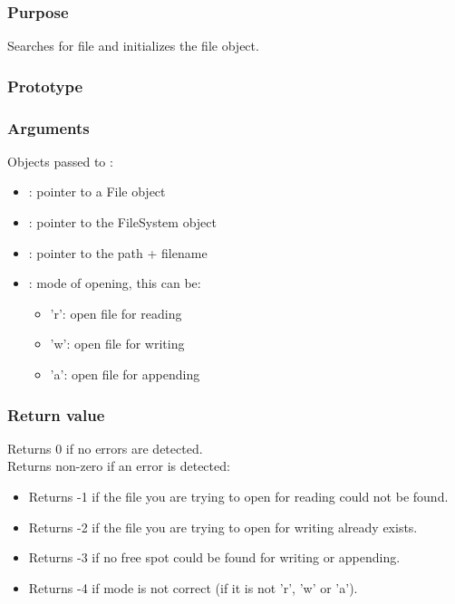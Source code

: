\subsubsection*{Purpose}
Searches for file and initializes the file object.
\subsubsection*{Prototype}
\subsubsection*{Arguments}
Objects passed to :
\begin{itemize}
	\item{: pointer to a File object}
	\item{: pointer to the FileSystem object}
	\item{: pointer to the path + filename}
	\item
	{
		: mode of opening, this can be:
		\begin{itemize}
			\item{'r': open file for reading}
			\item{'w': open file for writing}
			\item{'a': open file for appending}
		\end{itemize}
	}
\end{itemize}
\subsubsection*{Return value}
Returns 0 if no errors are detected.\\
\newline
Returns non-zero if an error is detected:
\begin{itemize}
	\item{Returns -1 if the file you are trying to open for reading could not
		be found.}
	\item{Returns -2 if the file you are trying to open for writing already
		exists.}
	\item{Returns -3 if no free spot could be found for writing or appending.}
	\item{Returns -4 if mode is not correct (if it is not 'r', 'w' or 'a').}
\end{itemize}
